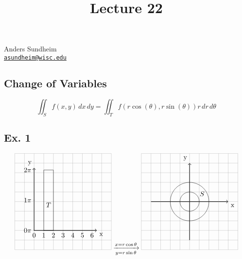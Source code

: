 \documentclass[12pt]{article}
\title{Lecture 22}
\begin{document}
\maketitle
\vspace*{-0.25in}
\begin{center}
	Anders Sundheim \\
	\href{mailto:asundheim@wisc.edu}{{\tt asundheim@wisc.edu}}
\end{center}
\subsection*{Change of Variables}
    \[ \iint_Sf(x,y)\,dx\,dy=\iint_Tf(r\cos(\theta),r\sin(\theta))r\,dr\,d\theta \]
\subsection*{Ex. 1}
    \[
        \begin{tikzpicture}[scale=0.5]
            \draw[thick,->] (0,0) -- (6.5,0) node[anchor=north west] {x};
            \draw[thick,->] (0,0) -- (0,6.5) node[anchor=south east] {y};
            \foreach \x in {0,1,2,3,4,5,6}
                \draw (\x cm,1pt) -- (\x cm,-1pt) node[anchor=north] {$\x$};
            \foreach \y in {0,1,2}
                \draw (1pt,3.14*\y cm) -- (-1pt,3.14*\y cm) node[anchor=east] {$\y\pi$};
            \draw[step=1cm,gray,very thin] (-2,-2) grid (8,8);
            \draw (1,0) rectangle (2, 2*pi);
            \draw (1.5,pi) node[anchor=north]{$T$};
        \end{tikzpicture}
        \xrightarrow[y=r\sin\theta]{x=r\cos\theta}
        \begin{tikzpicture}[scale=0.5]
            \draw[thick,->] (-1,3) -- (7,3) node[anchor=north west] {x};
            \draw[thick,->] (3,-1) -- (3,7) node[anchor=south east] {y};
            \draw[step=1cm,gray,very thin] (-2,-2) grid (8,8);
            \draw (3, 3) circle (1);
            \draw (3, 3) circle (2);
            \draw (4.3,4.3) node[anchor=north]{$S$};
        \end{tikzpicture}
    \]
\end{document}
